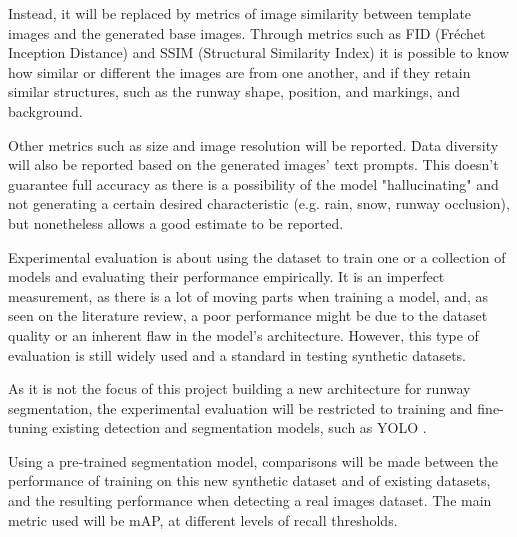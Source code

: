 Instead, it will be replaced by metrics of image similarity between template
images and the generated base images. Through metrics such as FID (Fréchet
Inception Distance) and SSIM (Structural Similarity Index) it is possible to
know how similar or different the images are from one another, and if they
retain similar structures, such as the runway shape, position, and markings, and background.

Other metrics such as size and image resolution will be reported. Data diversity will also be reported based on the generated images' text prompts. This doesn't guarantee full accuracy as there is a possibility of the model "hallucinating" and not generating a certain desired characteristic (e.g. rain, snow, runway occlusion), but nonetheless allows a good estimate to be reported.

Experimental evaluation is about using the dataset to train one or a collection of models and evaluating their performance empirically. It is an imperfect measurement, as there is a lot of moving parts when training a model, and, as seen on the literature review, a poor performance might be due to the dataset quality or an inherent flaw in the model's architecture. However, this type of evaluation is still widely used and a standard in testing synthetic datasets.

As it is not the focus of this project building a new architecture for runway
segmentation, the experimental evaluation will be restricted to training and
fine-tuning existing detection and segmentation models, such as YOLO
\cite{jocher_ultralytics_2023}.

Using a pre-trained segmentation model, comparisons will be made between the
performance of training on this new synthetic dataset and of existing datasets,
and the resulting performance when detecting a real images dataset. The main
metric used will be \ac{mAP}, at different levels of recall thresholds.
